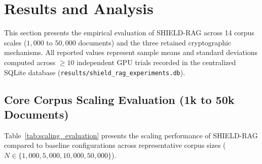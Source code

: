 \documentclass[10pt,a4paper]{article}
\begin{document}
\section{Results and Analysis}
\label{sec:results}
This section presents the empirical evaluation of SHIELD-RAG across 14 corpus scales ($1{,}000$ to $50{,}000$ documents) and the three retained cryptographic mechanisms. All reported values represent sample means and standard deviations computed across $\ge 10$ independent GPU trials recorded in the centralized SQLite database (\texttt{results/shield\_rag\_experiments.db}).

\subsection{Core Corpus Scaling Evaluation (1k to 50k Documents)}
Table~\ref{tab:scaling_evaluation} presents the scaling performance of SHIELD-RAG compared to baseline configurations across representative corpus sizes ($N \in \{1{,}000, 5{,}000, 10{,}000, 50{,}000\}$).
\end{document}
